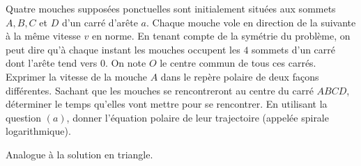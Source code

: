 \begin{Exercise}[title=Quatre mouches et un carré]
  Quatre mouches supposées ponctuelles sont initialement situées aux sommets $A, B, C$ et $D$ d'un carré d'arête $a$. Chaque mouche vole en direction de la suivante à la même vitesse $v$ en norme. En tenant compte de la symétrie du problème, on peut dire qu'à chaque instant les mouches occupent les $4$ sommets d'un carré dont l'arête tend vers $0$. On note $O$ le centre commun de tous ces carrés.
  \Question Exprimer la vitesse de la mouche $A$ dans le repère polaire de deux façons différentes.
  \Question Sachant que les mouches se rencontreront au centre du carré $ABCD$, déterminer le temps qu'elles vont mettre pour se rencontrer.
  \Question En utilisant la question $(a)$, donner l'équation polaire de leur trajectoire (appelée spirale logarithmique).
\end{Exercise}
\begin{Answer}
Analogue à la solution en triangle.
\end{Answer}

